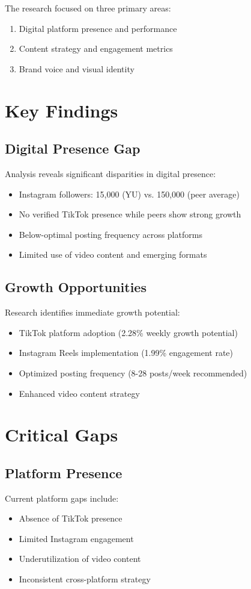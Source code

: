 \documentclass[12pt]{report}
\begin{document}
The research focused on three primary areas:
\begin{enumerate}
    \item Digital platform presence and performance
    \item Content strategy and engagement metrics
    \item Brand voice and visual identity
\end{enumerate}

\section{Key Findings}
\subsection{Digital Presence Gap}
Analysis reveals significant disparities in digital presence:
\begin{itemize}
    \item Instagram followers: 15,000 (YU) vs. 150,000 (peer average)
    \item No verified TikTok presence while peers show strong growth
    \item Below-optimal posting frequency across platforms
    \item Limited use of video content and emerging formats
\end{itemize}

\subsection{Growth Opportunities}
Research identifies immediate growth potential:
\begin{itemize}
    \item TikTok platform adoption (2.28\% weekly growth potential)
    \item Instagram Reels implementation (1.99\% engagement rate)
    \item Optimized posting frequency (8-28 posts/week recommended)
    \item Enhanced video content strategy
\end{itemize}

\section{Critical Gaps}
\subsection{Platform Presence}
Current platform gaps include:
\begin{itemize}
    \item Absence of TikTok presence
    \item Limited Instagram engagement
    \item Underutilization of video content
    \item Inconsistent cross-platform strategy
\end{itemize}
\end{document}
